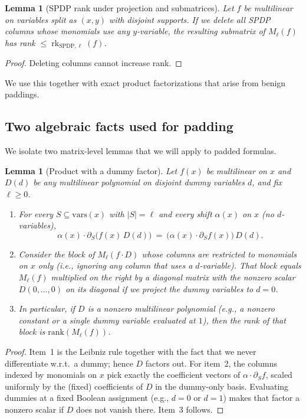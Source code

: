 \documentclass[12pt]{article}
\newtheorem{lemma}[theorem]{Lemma}
\theoremstyle{definition}
\theoremstyle{definition}
\theoremstyle{remark}
\theoremstyle{remark}
\begin{document}
\begin{lemma}[SPDP rank under projection and submatrices]\label{lem:rank-projection}
Let $f$ be multilinear on variables split as $(x,y)$ with disjoint supports. If we delete all SPDP columns whose monomials use any $y$-variable, the resulting submatrix of $M_\ell(f)$ has rank $\le\operatorname{rk}_{\mathrm{SPDP},\ell}(f)$.
\end{lemma}

\begin{proof}
Deleting columns cannot increase rank.
\end{proof}

We use this together with exact product factorizations that arise from benign paddings.

\subsection{Two algebraic facts used for padding}

We isolate two matrix-level lemmas that we will apply to padded formulas.

\begin{lemma}[Product with a dummy factor]\label{lem:product-dummy}
Let $f(x)$ be multilinear on $x$ and $D(d)$ be any multilinear polynomial on disjoint dummy variables $d$, and fix $\ell\ge0$.
\begin{enumerate}
\item For every $S\subseteq\mathrm{vars}(x)$ with $|S|=\ell$ and every shift $\alpha(x)$ on $x$ (no $d$-variables),
\[
\alpha(x)\cdot\partial_S\bigl(f(x)\,D(d)\bigr)\ =\ \bigl(\alpha(x)\cdot\partial_S f(x)\bigr)\,D(d).
\]
\item Consider the block of $M_\ell(f\cdot D)$ whose columns are restricted to monomials on $x$ only (i.e., ignoring any column that uses a $d$-variable). That block equals $M_\ell(f)$ multiplied on the right by a diagonal matrix with the nonzero scalar $D(0,\dots,0)$ on its diagonal if we project the dummy variables to $d=0$.
\item In particular, if $D$ is a nonzero multilinear polynomial (e.g., a nonzero constant or a single dummy variable evaluated at $1$), then the rank of that block is $\mathrm{rank}(M_\ell(f))$.
\end{enumerate}
\end{lemma}

\begin{proof}
Item~1 is the Leibniz rule together with the fact that we never differentiate w.r.t.\ a dummy; hence $D$ factors out. For item~2, the columns indexed by monomials on $x$ pick exactly the coefficient vectors of $\alpha\cdot\partial_S f$, scaled uniformly by the (fixed) coefficients of $D$ in the dummy-only basis. Evaluating dummies at a fixed Boolean assignment (e.g., $d=0$ or $d=1$) makes that factor a nonzero scalar if $D$ does not vanish there. Item~3 follows.
\end{proof}
\end{document}
